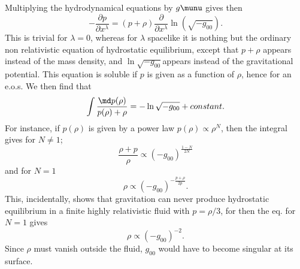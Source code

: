 Multiplying the hydrodynamical equations by $g\munu$ gives then
\begin{equation}
	-\frac{\partial p}{\partial x^\lambda}=(p+\rho) \frac{\partial}{\partial x^\lambda} \ln(\sqrt{-g_{00}}).
\end{equation}
This is trivial for $\lambda=0$, whereas for $\lambda$ spacelike it is nothing but the ordinary non relativistic equation of hydrostatic equilibrium, except that $p+\rho$ appears instead of the mass density, and $\ln\sqrt{-g_{00}} $appears instead of the gravitational potential. This equation is soluble if $p$ is given as a function of $\rho$, hence for an e.o.s. We then find that
\begin{equation}
	\int \frac{\md p(\rho)}{p(\rho) + \rho} = - \ln \sqrt{-g_{00}} + constant.
\end{equation}
For instance, if $p( \rho)$ is given by a power law $p(\rho) \propto \rho^N$, then the integral gives for $N\neq1$;
\begin{equation}
	\frac{\rho+p}{\rho} \propto (-g_{00})^{\frac{1-N}{2N}}
\end{equation}
and for $N=1$
\begin{equation}
	\rho \propto (-g_{00})^{-\frac{p+\rho}{2 p}}.
\end{equation}
This, incidentally, shows that gravitation can never produce hydrostatic equilibrium in a finite highly relativistic fluid with $p = \rho/3$, for then the eq. for $N=1$ gives
\begin{equation}
	\rho \propto (-g_{00})^{-2}.
\end{equation}
Since $\rho$ must vanish outside the fluid, $g_{00}$ would have to become singular at its surface.





